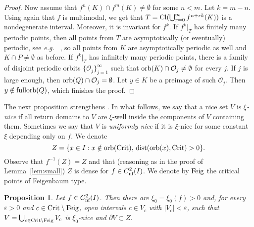 \documentclass[12pt, psamsfonts, reqno]{amsart}
\newtheorem{proposition}[theorem]{Proposition}
\begin{document}
\begin{proof}
 Now assume that $f^n(K)\cap f^m(K)\neq \emptyset$ for some $n<m$.
 Let $k=m-n$. Using again that $f$ is multimodal, we get that
 $T={\mathop{\rm Cl}\nolimits}(\bigcup_{r=0}^\infty f^{n+rk}(K))$ is a nondegenerate interval.
 Moreover, it is  invariant for $f^k$. If $f^k|_T$ has finitely many
 periodic points, then all points from $T$ are
 asymptotically (or eventually) periodic, see {{\em e.g.~}} \cite[p. 127]{BlCo},
 so all points from $K$ are asymptotically periodic as well and
 $K\cap P\neq \emptyset$ as before. If $f^k|_T$ has infinitely
 many periodic points, there is a family of disjoint periodic
 orbits $\{\mathcal{O}_j\}_{j=1}^\infty$ such that
 ${\mathop{\rm orb}\nolimits}(K)\cap \mathcal{O}_j \neq \emptyset$ for every $j$. If
 $j$ is large enough, then ${\mathop{\rm orb}\nolimits}(Q)\cap \mathcal{O}_j=\emptyset$.
 Let $y\in K$ be a preimage of such $\mathcal{O}_j$. Then $y\notin
 {\mathop{\rm fullorb}\nolimits}(Q)$, which finishes the proof.
\end{proof}

The next proposition strengthens
\cite[Proposition~5]{caili}. In what follows, we say that a nice
set $V$ is \emph{$\xi$-nice} if all return domains to $V$ are
$\xi$-well inside the components of $V$ containing them. Sometimes
we say that $V$ is \emph{uniformly nice} if it is $\xi$-nice for
some constant $\xi$ depending only on $f$. We denote
$$
 Z=\{x\in I: x\notin {\mathop{\rm orb}\nolimits}({\mathop{\rm Crit}\nolimits}),\,{\mathop{\rm dist}\nolimits}({\mathop{\rm orb}\nolimits}(x),{\mathop{\rm Crit}\nolimits})>0\}.
$$
Observe that $f^{-1}(Z) = Z$ and that
(reasoning as in the proof of Lemma~\ref{lem:small}) $Z$ is dense
for $f \in {C^2_{\text{\rm nf}}}(I)$.
We denote by ${\mathop{\rm Feig}\nolimits}$ the critical points of Feigenbaum type.

\begin{proposition} \label{prop:caili}
 Let $f\in {C^2_{\text{\rm nf}}}(I)$.
 Then there are $\xi_0=\xi_0(f)>0$ and, for every ${\varepsilon}>0$ and $c \in {\mathop{\rm Crit}\nolimits}\setminus {\mathop{\rm Feig}\nolimits}$, open
 intervals $c\in V_c$ with $|V_c|<{\varepsilon}$,
 such that $V=\bigcup_{c\in {\mathop{\rm Crit}\nolimits}\setminus {\mathop{\rm Feig}\nolimits}} V_c$ is
 $\xi_0$-nice and $\partial V\subset Z$.
\end{proposition}
\end{document}
